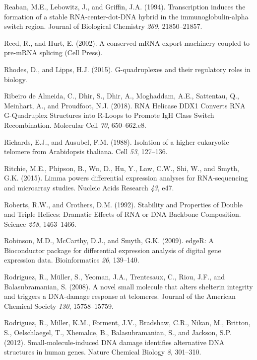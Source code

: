 \documentclass[12pt,a4paper,]{report}
\begin{document}
\leavevmode\hypertarget{ref-Reaban1994}{}%
Reaban, M.E., Lebowitz, J., and Griffin, J.A. (1994). Transcription
induces the formation of a stable RNA-center-dot-DNA hybrid in the
immunoglobulin-alpha switch region. Journal of Biological Chemistry
\emph{269}, 21850--21857.

\leavevmode\hypertarget{ref-Reed2002}{}%
Reed, R., and Hurt, E. (2002). A conserved mRNA export machinery coupled
to pre-mRNA splicing (Cell Press).

\leavevmode\hypertarget{ref-Rhodes2015}{}%
Rhodes, D., and Lipps, H.J. (2015). G-quadruplexes and their regulatory
roles in biology.

\leavevmode\hypertarget{ref-RibeirodeAlmeida2018}{}%
Ribeiro de Almeida, C., Dhir, S., Dhir, A., Moghaddam, A.E., Sattentau,
Q., Meinhart, A., and Proudfoot, N.J. (2018). RNA Helicase DDX1 Converts
RNA G-Quadruplex Structures into R-Loops to Promote IgH Class Switch
Recombination. Molecular Cell \emph{70}, 650--662.e8.

\leavevmode\hypertarget{ref-Richards1988}{}%
Richards, E.J., and Ausubel, F.M. (1988). Isolation of a higher
eukaryotic telomere from Arabidopsis thaliana. Cell \emph{53}, 127--136.

\leavevmode\hypertarget{ref-Ritchie2015}{}%
Ritchie, M.E., Phipson, B., Wu, D., Hu, Y., Law, C.W., Shi, W., and
Smyth, G.K. (2015). Limma powers differential expression analyses for
RNA-sequencing and microarray studies. Nucleic Acids Research \emph{43},
e47.

\leavevmode\hypertarget{ref-Roberts1992}{}%
Roberts, R.W., and Crothers, D.M. (1992). Stability and Properties of
Double and Triple Helices: Dramatic Effects of RNA or DNA Backbone
Composition. Science \emph{258}, 1463--1466.

\leavevmode\hypertarget{ref-Robinson2010}{}%
Robinson, M.D., McCarthy, D.J., and Smyth, G.K. (2009). edgeR: A
Bioconductor package for differential expression analysis of digital
gene expression data. Bioinformatics \emph{26}, 139--140.

\leavevmode\hypertarget{ref-Rodriguez2008}{}%
Rodriguez, R., Müller, S., Yeoman, J.A., Trentesaux, C., Riou, J.F., and
Balasubramanian, S. (2008). A novel small molecule that alters shelterin
integrity and triggers a DNA-damage response at telomeres. Journal of
the American Chemical Society \emph{130}, 15758--15759.

\leavevmode\hypertarget{ref-Rodriguez2012}{}%
Rodriguez, R., Miller, K.M., Forment, J.V., Bradshaw, C.R., Nikan, M.,
Britton, S., Oelschlaegel, T., Xhemalce, B., Balasubramanian, S., and
Jackson, S.P. (2012). Small-molecule-induced DNA damage identifies
alternative DNA structures in human genes. Nature Chemical Biology
\emph{8}, 301--310.
\end{document}
